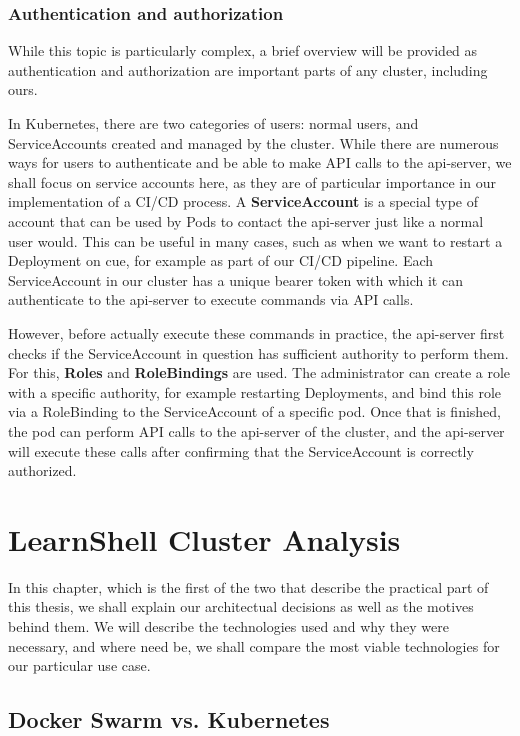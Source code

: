 \documentclass[thesis=B,english]{FITthesis}[2019/12/23]
\begin{document}
\subsection{Authentication and authorization}

While this topic is particularly complex, a brief overview will be provided as authentication and authorization are important parts of any cluster, including ours.

In Kubernetes, there are two categories of users: normal users, and ServiceAccounts created and managed by the cluster. While there are numerous ways for users to authenticate and be able to make API calls to the api-server, we shall focus on service accounts here, as they are of particular importance in our implementation of a CI/CD process. A \textbf{ServiceAccount} is a special type of account that can be used by Pods to contact the api-server just like a normal user would. This can be useful in many cases, such as when we want to restart a Deployment on cue, for example as part of our CI/CD pipeline. Each ServiceAccount in our cluster has a unique bearer token with which it can authenticate to the api-server to execute commands via API calls.

However, before actually execute these commands in practice, the api-server first checks if the ServiceAccount in question has sufficient authority to perform them. For this, \textbf{Roles} and \textbf{RoleBindings} are used. The administrator can create a role with a specific authority, for example restarting Deployments, and bind this role via a RoleBinding to the ServiceAccount of a specific pod. Once that is finished, the pod can perform API calls to the api-server of the cluster, and the api-server will execute these calls after confirming that the ServiceAccount is correctly authorized.


\chapter{LearnShell Cluster Analysis}

In this chapter, which is the first of the two that describe the practical part of this thesis, we shall explain our architectual decisions as well as the motives behind them. We will describe the technologies used and why they were necessary, and where need be, we shall compare the most viable technologies for our particular use case.

\section{Docker Swarm vs. Kubernetes}
\end{document}
